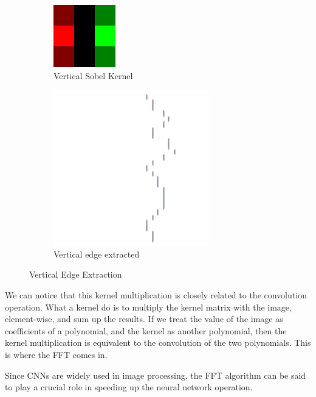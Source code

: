 \documentclass[a4paper,12pt]{article}
\begin{document}
\begin{figure}[H]
	\begin{subfigure}{0.5\textwidth}
		\centering
		\includegraphics[width=0.5\linewidth]{./sobel 2.png}
		\caption{Vertical Sobel Kernel}
		\label{fig:sobel 3}
	\end{subfigure}
	\begin{subfigure}{0.5\textwidth}
		\centering
		\includegraphics[width=0.5\linewidth]{./sobel 2 e.png}
		\caption{Vertical edge extracted}
		\label{fig:sobel 4}
	\end{subfigure}
	\caption{Vertical Edge Extraction}
\end{figure}

We can notice that this kernel multiplication is closely related to the convolution operation.
What a kernel do is to multiply the kernel matrix with the image, element-wise, and sum up the results.
If we treat the value of the image as coefficients of a polynomial, and the kernel as another polynomial, then the kernel multiplication is equivalent to the convolution of the two polynomials.
This is where the FFT comes in.

Since CNNs are widely used in image processing, the FFT algorithm can be said to play a crucial role in speeding up the neural network operation.
\end{document}
